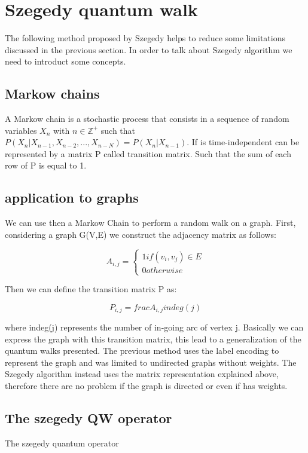 \section{Szegedy quantum walk}

The following method proposed by Szegedy helps to reduce some limitations discussed in the previous section. In order to 
talk about Szegedy algorithm we need to introduct some concepts.

\subsection{Markow chains}

A Markow chain is a stochastic process that consists in a sequence of random variables $X_{n}$ with $n \in \mathbb{Z}^{+}$
such that $P(X_{n} | X_{n-1}, X_{n-2},...,X_{n-N}) = P(X_{n} | X_{n-1})$. If is time-independent can be represented
by a matrix P called transition matrix. Such that the sum of each row of P is equal to 1.

\subsection{application to graphs}

We can use then a Markow Chain to perform a random walk on a graph. First, considering a graph G(V,E) we construct the adjacency matrix
as follows:

\begin{equation}
    A_{i,j} = 
    \begin{cases} 
        1 if (v_{i}, v_{j}) \in E \\
        0 otherwise
    \end{cases}
\end{equation}

Then we can define the transition matrix P as:

\begin{equation}
    P_{i,j} = frac{A_{i,j}}{indeg(j)}
\end{equation}

where indeg(j) represents the number of in-going arc of vertex j. Basically we can express the graph with this transition matrix, this lead to a
generalization of the quantum walks presented. The previous method uses the label encoding to represent the graph and was limited to undirected graphs
without weights. The Szegedy algorithm instead uses the matrix representation explained above, therefore there are no problem if the graph is directed
or even if has weights. 

\subsection{The szegedy QW operator}
The szegedy quantum operator